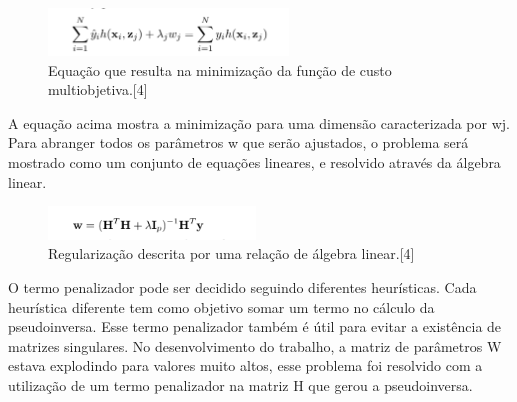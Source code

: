 \documentclass{article}
\begin{document}
\vspace{15pt}

\begin{figure}[h]

    \centering
    \includegraphics[height=0.5in]{rel_funcao_multi.png}
    \caption{Equação que resulta na minimização da função de custo multiobjetiva.[4]}
    \label{fig:example}
    
\end{figure}

\vspace{15pt}

A equação acima mostra a minimização para uma dimensão caracterizada por wj. Para abranger todos os parâmetros w que serão ajustados, o problema será mostrado como um conjunto de equações lineares, e resolvido através da álgebra linear.


\vspace{15pt}

\begin{figure}[h]

    \centering
    \includegraphics[height=0.35in]{pen_al.png}
    \caption{Regularização descrita por uma relação de álgebra linear.[4]}
    \label{fig:example}
    
\end{figure}

\vspace{15pt}

O termo penalizador pode ser decidido seguindo diferentes heurísticas. Cada heurística diferente tem como objetivo somar um termo no cálculo da pseudoinversa. Esse termo penalizador também é útil para evitar a existência de matrizes singulares. No desenvolvimento do trabalho, a matriz de parâmetros W estava explodindo para valores muito altos, esse problema foi resolvido com a utilização de um termo penalizador na matriz H que gerou a pseudoinversa.

\vspace{15pt}
\end{document}
